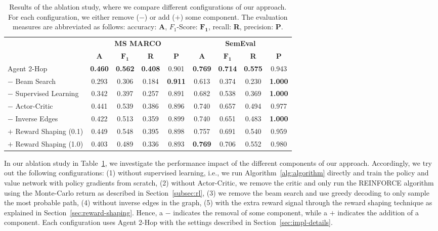 \begin{table}
\renewcommand{\tabcolsep}{3pt}
\centering
\caption{Results of the ablation study, where we compare different configurations of our approach. For each configuration, we 
either remove ($\mathbf{-}$) or add ($\mathbf{+}$) some component. The evaluation measures are 
abbreviated as follows: accuracy: \textbf{A}, $F_1$-Score: $\mathbf{F_1}$, recall: \textbf{R}, precision: \textbf{P}.}
\label{table-ablation}
	\begin{tabular}{lcccccccc} 
		\toprule
		& \multicolumn{4}{c}{\textbf{MS MARCO}} & \multicolumn{4}{c}{\textbf{SemEval}}  \\
		\cmidrule(lr{.6em}){2-5} \cmidrule(l{0.3em}){6-9}
		&\textbf{A} & \textbf{$\mathbf{F_1}$} & \textbf{R} & \textbf{P} & \textbf{A} & \textbf{$\mathbf{F_1}$} & \textbf{R} & \textbf{P}\\
		\midrule
		Agent 2-Hop & \textbf{0.460} & \textbf{0.562} & \textbf{0.408} & 0.901 & \textbf{0.769} & \textbf{0.714} & \textbf{0.575} & 0.943 \\ 
		\midrule
		$\mathbf{-}$ Beam Search & 0.293 & 0.306 &0.184 & \textbf{0.911} & 0.613 & 0.374 &0.230& \textbf{1.000} \\
		$\mathbf{-}$ Supervised Learning & 0.342 & 0.397 & 0.257 & 0.891 & 0.682 & 0.538 & 0.369 & \textbf{1.000} \\
		$\mathbf{-}$ Actor-Critic & 0.441 & 0.539 & 0.386 & 0.896 & 0.740 & 0.657 &0.494& 0.977 \\
		$\mathbf{-}$ Inverse Edges & 0.422 & 0.513 &0.359& 0.899 & 0.740 & 0.651 & 0.483 & \textbf{1.000} \\
		$\mathbf{+}$ Reward Shaping (0.1) & 0.449 & 0.548 & 0.395 & 0.898 & 0.757 & 0.691 & 0.540 & 0.959 \\
		$\mathbf{+}$ Reward Shaping (1.0) & 0.403 &0.489 & 0.336 & 0.893 & \textbf{0.769} & 0.706 & 0.552 & 0.980 \\
		\bottomrule
	\end{tabular}
\end{table}

In our ablation study in Table~\ref{table-ablation}, we investigate the performance impact of the different components 
of our approach. Accordingly, we try out the following configurations: (1) without supervised 
learning, i.e., we run Algorithm~\ref{alg:algorithm} directly and train the policy and value network with 
policy gradients from scratch, (2) without Actor-Critic, we remove the critic and only run the 
REINFORCE algorithm using the Monte-Carlo return as described in Section~\ref{subsec:rl}, (3) we remove the beam search and use 
greedy decoding to only sample the most probable path, (4) without inverse edges in the graph, 
(5) with the extra reward signal through the reward shaping technique as explained in Section~\ref{sec:reward-shaping}.
Hence, a $-$ indicates the removal of some component, while a $+$ indicates the addition of a component.
Each configuration uses Agent 2-Hop with the settings described in Section~\ref{sec:impl-details}.

